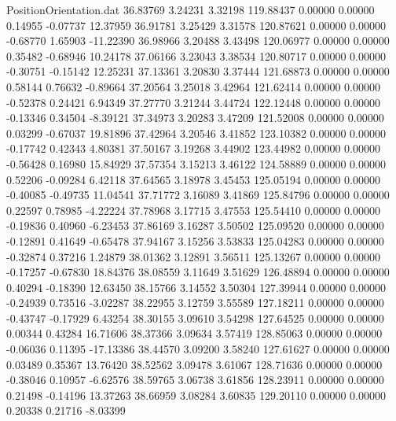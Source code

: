\begin{filecontents}{PositionOrientation.dat}
  36.83769    3.24231    3.32198   119.88437    0.00000    0.00000    0.14955   -0.07737   12.37959
  36.91781    3.25429    3.31578   120.87621    0.00000    0.00000   -0.68770    1.65903  -11.22390
  36.98966    3.20488    3.43498   120.06977    0.00000    0.00000    0.35482   -0.68946   10.24178
  37.06166    3.23043    3.38534   120.80717    0.00000    0.00000   -0.30751   -0.15142   12.25231
  37.13361    3.20830    3.37444   121.68873    0.00000    0.00000    0.58144    0.76632   -0.89664
  37.20564    3.25018    3.42964   121.62414    0.00000    0.00000   -0.52378    0.24421    6.94349
  37.27770    3.21244    3.44724   122.12448    0.00000    0.00000   -0.13346    0.34504   -8.39121
  37.34973    3.20283    3.47209   121.52008    0.00000    0.00000    0.03299   -0.67037   19.81896
  37.42964    3.20546    3.41852   123.10382    0.00000    0.00000   -0.17742    0.42343    4.80381
  37.50167    3.19268    3.44902   123.44982    0.00000    0.00000   -0.56428    0.16980   15.84929
  37.57354    3.15213    3.46122   124.58889    0.00000    0.00000    0.52206   -0.09284    6.42118
  37.64565    3.18978    3.45453   125.05194    0.00000    0.00000   -0.40085   -0.49735   11.04541
  37.71772    3.16089    3.41869   125.84796    0.00000    0.00000    0.22597    0.78985   -4.22224
  37.78968    3.17715    3.47553   125.54410    0.00000    0.00000   -0.19836    0.40960   -6.23453
  37.86169    3.16287    3.50502   125.09520    0.00000    0.00000   -0.12891    0.41649   -0.65478
  37.94167    3.15256    3.53833   125.04283    0.00000    0.00000   -0.32874    0.37216    1.24879
  38.01362    3.12891    3.56511   125.13267    0.00000    0.00000   -0.17257   -0.67830   18.84376
  38.08559    3.11649    3.51629   126.48894    0.00000    0.00000    0.40294   -0.18390   12.63450
  38.15766    3.14552    3.50304   127.39944    0.00000    0.00000   -0.24939    0.73516   -3.02287
  38.22955    3.12759    3.55589   127.18211    0.00000    0.00000   -0.43747   -0.17929    6.43254
  38.30155    3.09610    3.54298   127.64525    0.00000    0.00000    0.00344    0.43284   16.71606
  38.37366    3.09634    3.57419   128.85063    0.00000    0.00000   -0.06036    0.11395  -17.13386
  38.44570    3.09200    3.58240   127.61627    0.00000    0.00000    0.03489    0.35367   13.76420
  38.52562    3.09478    3.61067   128.71636    0.00000    0.00000   -0.38046    0.10957   -6.62576
  38.59765    3.06738    3.61856   128.23911    0.00000    0.00000    0.21498   -0.14196   13.37263
  38.66959    3.08284    3.60835   129.20110    0.00000    0.00000    0.20338    0.21716   -8.03399

\end{filecontents}

